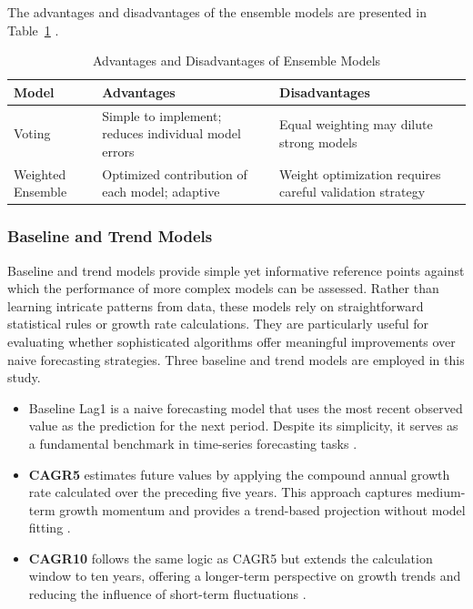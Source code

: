 \documentclass[final, 9pt, twocolumn]{saucis}
\begin{document}
The advantages and disadvantages of the ensemble models are presented in Table~\ref{tab:ensemble_pros_cons} .

\begin{table}[htbp]
\centering
\caption{Advantages and Disadvantages of Ensemble Models}
\label{tab:ensemble_pros_cons}
\small
\begin{tabular}{p{1.2cm} p{3.15cm} p{3.15cm}}
\hline
Model & Advantages & Disadvantages \\
\hline
Voting
& Simple to implement; reduces individual model errors
& Equal weighting may dilute strong models \\
Weighted Ensemble
& Optimized contribution of each model; adaptive
& Weight optimization requires careful validation strategy \\
\hline
\end{tabular}
\end{table}

\subsubsection{Baseline and Trend Models}

Baseline and trend models provide simple yet informative reference points against which the performance of more complex models can be assessed. Rather than learning intricate patterns from data, these models rely on straightforward statistical rules or growth rate calculations. They are particularly useful for evaluating whether sophisticated algorithms offer meaningful improvements over naive forecasting strategies. Three baseline and trend models are employed in this study.

\begin{itemize}
    \item Baseline Lag1 is a naive forecasting model that 
    uses the most recent observed value as the prediction for the 
    next period. Despite its simplicity, it serves as a fundamental benchmark in time-series forecasting tasks \cite{method17}.

    \item \textbf{CAGR5} estimates future values by applying the 
    compound annual growth rate calculated over the preceding five 
    years. This approach captures medium-term growth momentum and 
    provides a trend-based projection without model fitting 
    \cite{method18}.

    \item \textbf{CAGR10} follows the same logic as CAGR5 but 
    extends the calculation window to ten years, offering a 
    longer-term perspective on growth trends and reducing the 
    influence of short-term fluctuations \cite{method18}.
\end{itemize}
\end{document}
